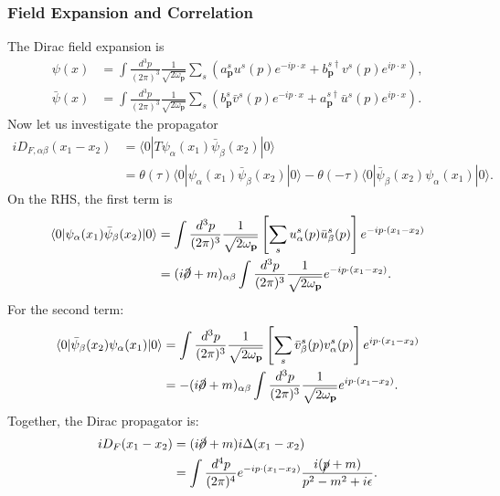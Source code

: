 \subsubsection{Field Expansion and Correlation}
The Dirac field expansion is
\begin{equation}
\begin{aligned}
	\psi(x) &=\int \frac{d^{3} p}{(2 \pi)^{3}} \frac{1}{\sqrt{2 \omega_{\mathbf{p}}}} 
		\sum_{s}\left(a_{\mathbf{p}}^{s} u^{s}(p) e^{-i p \cdot x}
		+b_{\mathbf{p}}^{s \dagger} v^{s}(p) e^{i p \cdot x}\right), \\
	\bar{\psi}(x) &=\int \frac{d^{3} p}{(2 \pi)^{3}} \frac{1}{\sqrt{2 \omega_{\mathbf{p}}}} 
		\sum_{s}\left(b_{\mathbf{p}}^{s} \bar{v}^{s}(p) e^{-i p \cdot x}
		+a_{\mathbf{p}}^{s \dagger} \bar{u}^{s}(p) e^{i p \cdot x}\right).
\end{aligned}
\end{equation}
Now let us investigate the propagator
\begin{equation}
\begin{aligned}
	iD_{F,\alpha\beta}(x_1-x_2) &= \langle0|T\psi_\alpha(x_1)\bar\psi_\beta(x_2)|0\rangle \\
	&= \theta(\tau) \langle0|\psi_\alpha(x_1)\bar\psi_\beta(x_2)|0\rangle - \theta(-\tau) \langle0|\bar\psi_\beta(x_2)\psi_\alpha(x_1)|0\rangle.
\end{aligned}
\end{equation}
On the RHS, the first term is
\begin{equation*}
\begin{aligned}
	\langle0|\psi_\alpha(x_1)\bar\psi_\beta(x_2)|0\rangle 
	&= \int \frac{d^{3} p}{(2 \pi)^{3}} \frac{1}{\sqrt{2 \omega_{\mathbf{p}}}} \left[\sum_s u_\alpha^s(p)\bar u_\beta^s(p)\right]e^{-i p\cdot (x_1-x_2)} \\
	&= (i\cancel \partial+m)_{\alpha\beta}\int \frac{d^{3} p}{(2 \pi)^{3}} \frac{1}{\sqrt{2 \omega_{\mathbf{p}}}} e^{-i p\cdot (x_1-x_2)}.
\end{aligned}
\end{equation*}
For the second term:
\begin{equation*}
\begin{aligned}
	\langle0|\bar\psi_\beta(x_2)\psi_\alpha(x_1)|0\rangle
	&= \int \frac{d^{3} p}{(2 \pi)^{3}} \frac{1}{\sqrt{2 \omega_{\mathbf{p}}}} \left[\sum_s \bar v_\beta^s(p)v_\alpha^s(p)\right]e^{i p\cdot (x_1-x_2)} \\
	&= -(i\cancel \partial + m)_{\alpha\beta}\int \frac{d^{3} p}{(2 \pi)^{3}} \frac{1}{\sqrt{2 \omega_{\mathbf{p}}}} e^{i p\cdot (x_1-x_2)}.
\end{aligned}
\end{equation*}
Together, the Dirac propagator is:
\begin{equation}
\begin{aligned}
	iD_F(x_1-x_2) &= (i\cancel \partial+m)i\Delta(x_1-x_2) \\
	&= \int\frac{d^{4} p}{(2\pi)^{4}} e^{-i p\cdot (x_1-x_2)}\frac{i(\cancel p+m)}{p^2-m^2+i\epsilon}.
\end{aligned}
\end{equation}




